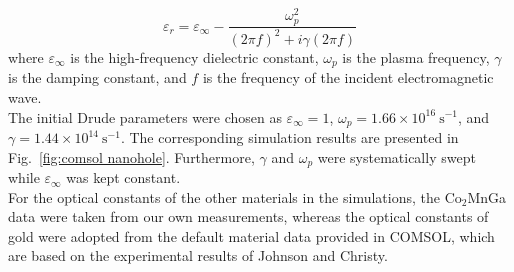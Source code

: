 \documentclass[journal]{IEEEtran}
\begin{document}
\begin{equation}
\varepsilon_r=\varepsilon_{\infty}-\frac{\omega_p^2}{(2\pi f)^2+i\gamma(2\pi f)}
\label{eq:Drude}
\end{equation}
\indent
where $\varepsilon_{\infty}$ is the high-frequency dielectric constant, $\omega_p$ is the plasma frequency, $\gamma$ is the damping constant, and $f$ is the frequency of the incident electromagnetic wave.\\
\indent
The initial Drude parameters were chosen as $\varepsilon_{\infty}=1$, $\omega_p=1.66\times10^{16}~\mathrm{s}^{-1}$, and $\gamma=1.44\times10^{14}~\mathrm{s}^{-1}$. The corresponding simulation results are presented in Fig.~\ref{fig:comsol nanohole}. Furthermore, $\gamma$ and $\omega_p$ were systematically swept while $\varepsilon_{\infty}$ was kept constant.\\
\indent
For the optical constants of the other materials in the simulations, the Co$_2$MnGa data were taken from our own measurements, whereas the optical constants of gold were adopted from the default material data provided in COMSOL, which are based on the experimental results of Johnson and Christy.\\
\end{document}
